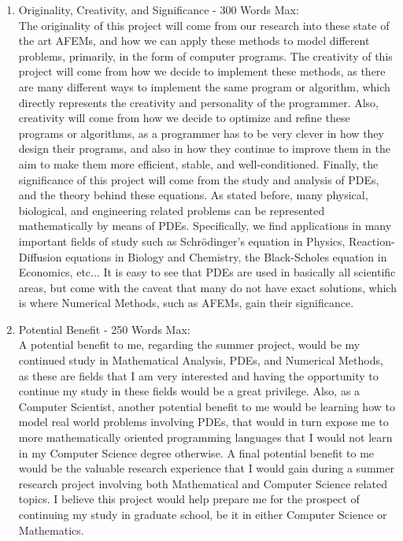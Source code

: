 \documentclass[11pt]{article}
\begin{document}
\begin{enumerate}
\item Originality, Creativity, and Significance - 300 Words Max: \\
The originality of this project will come from our research into these state of the art AFEMs, and how we can apply these methods to model different problems,
primarily, in the form of computer programs. The creativity of this project will come from how we decide to implement these methods, as there
are many different ways to implement the same program or algorithm, which directly represents the creativity and personality of the programmer.
Also, creativity will come from how we decide to optimize and refine these programs or algorithms, as a programmer has to be very clever in how they
design their programs, and also in how they continue to improve them in the aim to make them more efficient, stable, and well-conditioned.
Finally, the significance of this project will come from the study and analysis of PDEs, and the theory behind these equations. As stated before, many physical, biological, and engineering related
problems can be represented mathematically by means of PDEs. Specifically, we find applications in many important fields of study such as Schrödinger's equation in Physics,
Reaction-Diffusion equations in Biology and Chemistry, the Black-Scholes equation in Economics, etc... It is easy to see that PDEs are used in basically all scientific areas,
but come with the caveat that many do not have exact solutions, which is where Numerical Methods, such as AFEMs, gain their significance.

\newpage

\item Potential Benefit - 250 Words Max: \\
A potential benefit to me, regarding the summer project, would be my continued study in Mathematical Analysis, PDEs, and Numerical Methods,
as these are fields that I am very interested and having the opportunity to continue my study in these fields would be a great privilege.
Also, as a Computer Scientist, another potential benefit to me would be learning how to model real world 
problems involving PDEs, that would in turn
expose me to more mathematically oriented programming languages that I would not learn in my Computer Science degree otherwise.
A final potential benefit to me would be the valuable research experience that I would gain during a summer research project involving both Mathematical
and Computer Science related topics. I believe this project would
help prepare me for the prospect of continuing my study in graduate school, be it in either Computer Science or Mathematics.


\end{enumerate}
\end{document}
